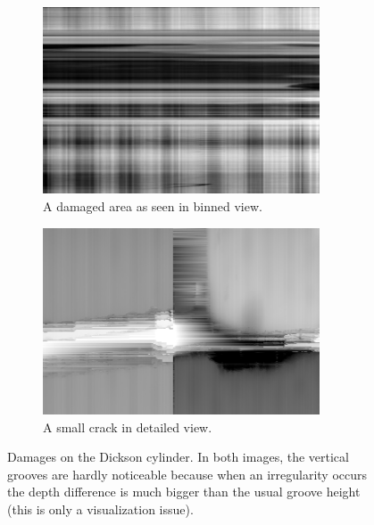 \begin{figure}[!ht]
\centering
    \begin{subfigure}[t]{0.49\textwidth}
    \centering
    \includegraphics[width=0.9\textwidth]{images/dickson-damage-big}
    \caption{A damaged area as seen in binned view.}
    \label{fig:dicksonbig}
    \end{subfigure}
    \begin{subfigure}[t]{0.49\textwidth}
    \centering
    \includegraphics[width=0.9\textwidth]{images/dickson-crack}
    \caption{A small crack in detailed view.}
    \label{fig:dicksoncrack}
    \end{subfigure}
    \caption[Damages on the Dickson cylinder.]{Damages on the Dickson cylinder. In both images, the vertical grooves are hardly noticeable because when an irregularity occurs the depth difference is much bigger than the usual groove height (this is only a visualization issue).}
    \label{fig:dicksondamage}
\end{figure}

